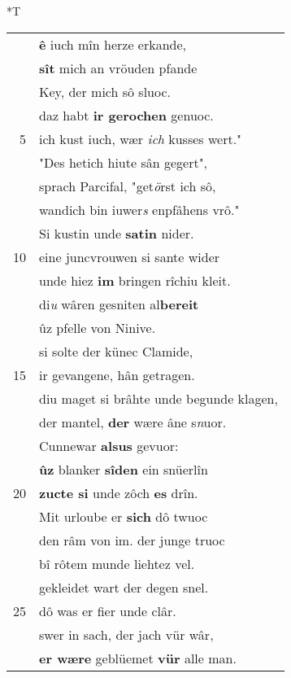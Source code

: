 \documentclass[8pt,a4paper,notitlepage]{article}
\begin{document}
\begin{table}[ht]
\begin{minipage}[t]{0.5\linewidth}
\end{minipage}
\hspace{0.5cm}
\begin{minipage}[t]{0.5\linewidth}
\small
\begin{center}*T
\end{center}
\begin{tabular}{rl}
 & \textbf{ê} iuch mîn herze erkande,\\ 
 & \textbf{sît} mich an vröuden pfande\\ 
 & Key, der mich sô sluoc.\\ 
 & daz habt \textbf{ir gerochen} genuoc.\\ 
5 & ich kust iuch, wær \textit{ich} kusses wert."\\ 
 & "Des hetich hiute sân gegert",\\ 
 & sprach Parcifal, "get\textit{ö}rst ich sô,\\ 
 & wandich bin iuwer\textit{s} enpfâhens vrô."\\ 
 & Si kustin unde \textbf{satin} nider.\\ 
10 & eine juncvrouwen si sante wider\\ 
 & unde hiez \textbf{im} bringen rîchiu kleit.\\ 
 & di\textit{u} wâren gesniten al\textbf{bereit}\\ 
 & ûz pfelle von Ninive.\\ 
 & si solte der künec Clamide,\\ 
15 & ir gevangene, hân getragen.\\ 
 & diu maget si brâhte unde begunde klagen,\\ 
 & der mantel, \textbf{der} wære âne s\textit{n}uor.\\ 
 & Cunnewar \textbf{alsus} gevuor:\\ 
 & \textbf{ûz} blanker \textbf{sîden} ein snüerlîn\\ 
20 & \textbf{zucte si} unde zôch \textbf{es} drîn.\\ 
 & Mit urloube er \textbf{sich} dô twuoc\\ 
 & den râm von im. der junge truoc\\ 
 & bî rôtem munde liehtez vel.\\ 
 & gekleidet wart der degen snel.\\ 
25 & dô was er fier unde clâr.\\ 
 & swer in sach, der jach vür wâr,\\ 
 & \textbf{er wære} geblüemet \textbf{vür} alle man.\\ 

\end{tabular}
\end{minipage}
\end{table}
\end{document}

